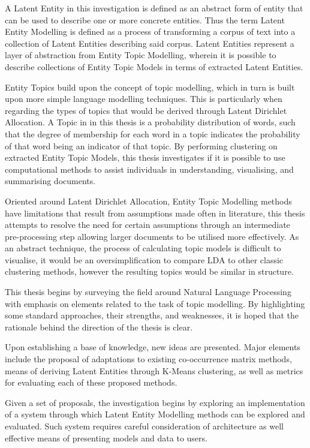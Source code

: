 \documentclass[10pt]{report}
\begin{document}
A Latent Entity in this investigation is defined as an abstract form of entity that can be used to describe one or more concrete entities. Thus the term Latent Entity Modelling is defined as a process of transforming a corpus of text into a collection of Latent Entities describing said corpus. Latent Entities represent a layer of abstraction from Entity Topic Modelling, wherein it is possible to describe collections of Entity Topic Models in terms of extracted Latent Entities.

Entity Topics build upon the concept of topic modelling, which in turn is built upon more simple language modelling techniques. This is particularly when regarding the types of topics that would be derived through Latent Dirichlet Allocation. A Topic in in this thesis is a probability distribution of words, such that the degree of membership for each word in a topic indicates the probability of that word being an indicator of that topic. By performing clustering on extracted Entity Topic Models, this thesis investigates if it is possible to use computational methods to assist individuals in understanding, visualising, and summarising documents. 

Oriented around Latent Dirichlet Allocation, Entity Topic Modelling methods have limitations that result from assumptions made often in literature, this thesis attempts to resolve the need for certain assumptions through an intermediate pre-processing step allowing larger documents to be utilised more effectively. As an abstract technique, the process of calculating topic models is difficult to visualise, it would be an oversimplification to compare LDA to other classic clustering methods, however the resulting topics would  be similar in structure.

This thesis begins by surveying the field around Natural Language Processing with emphasis on elements related to the task of topic modelling. By highlighting some standard approaches, their strengths, and weaknesses, it is hoped that the rationale behind the direction of the thesis is clear.

Upon establishing a base of knowledge, new ideas are presented. Major elements include the proposal of adaptations to existing co-occurrence matrix methods, means of deriving Latent Entities through K-Means clustering, as well as metrics for evaluating each of these proposed methods.

Given a set of proposals, the investigation begins by exploring an implementation of a system through which Latent Entity Modelling methods can be explored and evaluated. Such system requires careful consideration of architecture as well effective means of presenting models and data to users.
\end{document}
